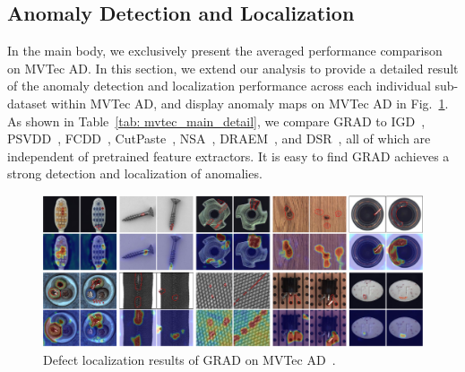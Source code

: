 \subsection{Anomaly Detection and Localization}
In the main body, we exclusively present the averaged performance comparison on MVTec AD. In this section, we extend our analysis to provide a detailed result of the anomaly detection and localization performance across each individual sub-dataset within MVTec AD, and display anomaly maps on MVTec AD in Fig.~\ref{fig: main_mvtec_ad_results}. As shown in Table~\ref{tab: mvtec_main_detail}, we compare GRAD to IGD~\cite{IGD}, PSVDD~\cite{PSVDD}, FCDD~\cite{FCDD}, CutPaste~\cite{CutPaste}, NSA~\cite{NSA}, DRAEM~\cite{DRAEM}, and DSR~\cite{DSR}, all of which are independent of pretrained feature extractors. It is easy to find GRAD achieves a strong detection and localization of anomalies.  

\begin{figure}[!h]
    \centering
\includegraphics[width=0.9\linewidth]{images/mvtec_results.pdf}
    \caption{Defect localization results of GRAD on MVTec AD~\cite{MVTecAD}. } 
    \label{fig: main_mvtec_ad_results}
\end{figure}



